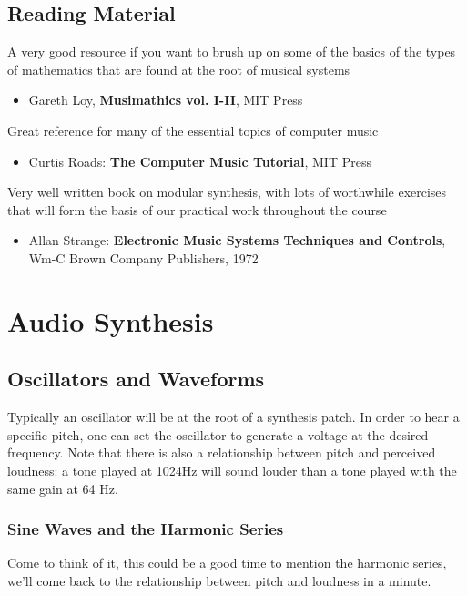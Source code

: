 \documentclass[11pt]{article}
\begin{document}
\subsection{Reading Material}
\label{sec:org2387a46}

A very good resource if you want to brush up on some of the basics of the types of mathematics that are found at the root of musical systems
\begin{itemize}
\item Gareth Loy, \textbf{Musimathics vol. I-II}, MIT Press
\end{itemize}

Great reference for many of the essential topics of computer music
\begin{itemize}
\item Curtis Roads: \textbf{The Computer Music Tutorial}, MIT Press
\end{itemize}

Very well written book on modular synthesis, with lots of worthwhile exercises that will form the basis of our practical work throughout the course
\begin{itemize}
\item Allan Strange: \textbf{Electronic Music Systems Techniques and Controls}, Wm-C Brown Company Publishers, 1972
\end{itemize}

\section{Audio Synthesis}
\label{sec:org47a512c}
\subsection{Oscillators and Waveforms}
\label{sec:orgde758bb}
Typically an oscillator will be at the root of a synthesis patch. 
In order to hear a specific pitch, one can set the oscillator to 
generate a voltage at the desired frequency.  
Note that there is also a relationship between pitch and perceived 
loudness: a tone played at 1024Hz will sound louder than a tone played with the same gain at 64 Hz.

\subsubsection{Sine Waves and the Harmonic Series}
\label{sec:org4d46036}
Come to think of it, this could be a good time to mention the harmonic
series, we'll come back to the relationship between pitch and loudness
in a minute. 
\end{document}
